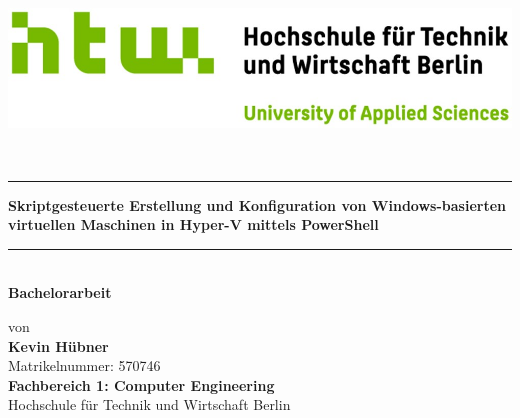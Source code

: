 \documentclass[conference]{IEEEtran}
\begin{document}
\begin{titlepage}
    \thispagestyle{empty}
    \parindent=0pt
    \begin{minipage}[b]{0.35\textwidth}
        \includegraphics[width=\textwidth]{Pictures/htw-berlin_logo.jpg}
    \end{minipage}
    \begin{minipage}[b]{0.65\textwidth}
        ~
    \end{minipage}

    \vspace{0.5em}
    \textcolor{HKS66}{\rule{\linewidth}{0.4mm}}


    \begin{center}
        {\LARGE\bfseries\color{HKS66} Skriptgesteuerte Erstellung und Konfiguration von Windows-basierten virtuellen Maschinen in Hyper-V mittels PowerShell} \\[1em]
        \textcolor{HKS66}{\rule{\linewidth}{0.4mm}}\\[1.5em]
        {\LARGE\bfseries Bachelorarbeit}
    \end{center}


    \begin{center}
        \normalsize %
        von\\[2ex]
        {\bfseries\large\fontsize{14pt}{16pt}\selectfont Kevin Hübner}\\[2ex]
        Matrikelnummer: 570746\\[4ex]
        {\bfseries\fontsize{13pt}{15pt}\selectfont Fachbereich 1: Computer Engineering}\\
        Hochschule für Technik und Wirtschaft Berlin\\[2ex]
    \end{center}



\end{titlepage}
\end{document}
